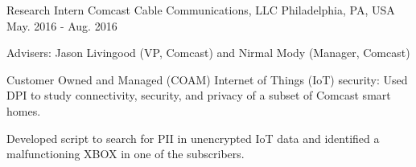 \begin{cventries}
{\begin{cvitems}
{      		}
      \end{cvitems}
    }

  \cventry
    {Research Intern} %
    {Comcast Cable Communications, LLC} %
    {Philadelphia, PA, USA} %
    {May. 2016 - Aug. 2016} %
    {
      \begin{cvitems} %
      \item {Advisers: Jason Livingood (VP, Comcast) and Nirmal Mody (Manager, Comcast)}
%      
      \item {Customer Owned and Managed (COAM) Internet of Things (IoT) security: Used DPI to study connectivity, security, and privacy of a subset of Comcast smart homes.}
      \item {Developed script to search for PII in unencrypted IoT data and identified a malfunctioning XBOX in one of the subscribers.}
%      
      \end{cvitems}
    }


\end{cventries}
